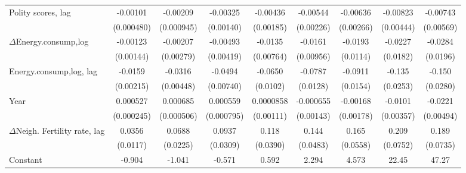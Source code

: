 \begin{table}[htbp]
\begin{tabular}{l*{8}{c}}
Polity scores, lag             &    -0.00101\sym{**} &    -0.00209\sym{**} &    -0.00325\sym{**} &    -0.00436\sym{**} &    -0.00544\sym{**} &    -0.00636\sym{**} &    -0.00823\sym{*}  &    -0.00743         \\
                    &  (0.000480)         &  (0.000945)         &   (0.00140)         &   (0.00185)         &   (0.00226)         &   (0.00266)         &   (0.00444)         &   (0.00569)         \\
[1em]
$\Delta$Energy.consump,log           &    -0.00123         &    -0.00207         &    -0.00493         &     -0.0135\sym{*}  &     -0.0161\sym{*}  &     -0.0193\sym{*}  &     -0.0227         &     -0.0284         \\
                    &   (0.00144)         &   (0.00279)         &   (0.00419)         &   (0.00764)         &   (0.00956)         &    (0.0114)         &    (0.0182)         &    (0.0196)         \\
[1em]
Energy.consump,log, lag           &     -0.0159\sym{***}&     -0.0316\sym{***}&     -0.0494\sym{***}&     -0.0650\sym{***}&     -0.0787\sym{***}&     -0.0911\sym{***}&      -0.135\sym{***}&      -0.150\sym{***}\\
                    &   (0.00215)         &   (0.00448)         &   (0.00740)         &    (0.0102)         &    (0.0128)         &    (0.0154)         &    (0.0253)         &    (0.0280)         \\
[1em]
Year                &    0.000527\sym{**} &    0.000685         &    0.000559         &   0.0000858         &   -0.000655         &    -0.00168         &     -0.0101\sym{***}&     -0.0221\sym{***}\\
                    &  (0.000245)         &  (0.000506)         &  (0.000795)         &   (0.00111)         &   (0.00143)         &   (0.00178)         &   (0.00357)         &   (0.00494)         \\
[1em]
$\Delta$Neigh. Fertility rate, lag&      0.0356\sym{***}&      0.0688\sym{***}&      0.0937\sym{***}&       0.118\sym{***}&       0.144\sym{***}&       0.165\sym{***}&       0.209\sym{***}&       0.189\sym{**} \\
                    &    (0.0117)         &    (0.0225)         &    (0.0309)         &    (0.0390)         &    (0.0483)         &    (0.0558)         &    (0.0752)         &    (0.0735)         \\
[1em]
Constant            &      -0.904\sym{*}  &      -1.041         &      -0.571         &       0.592         &       2.294         &       4.573         &       22.45\sym{***}&       47.27\sym{***}\\

\end{tabular}
\end{table}
